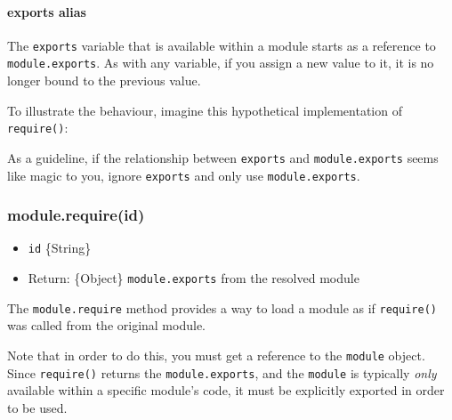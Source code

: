 \paragraph{exports alias}\label{exports-alias}

The \texttt{exports} variable that is available within a module starts
as a reference to \texttt{module.exports}. As with any variable, if you
assign a new value to it, it is no longer bound to the previous value.

To illustrate the behaviour, imagine this hypothetical implementation of
\texttt{require()}:

\begin{Shaded}
\begin{Highlighting}[]
 
   
     
  \NormalTok{);}
   
\NormalTok{\}}
\end{Highlighting}
\end{Shaded}

As a guideline, if the relationship between \texttt{exports} and
\texttt{module.exports} seems like magic to you, ignore \texttt{exports}
and only use \texttt{module.exports}.

\subsubsection{module.require(id)}\label{module.requireid}

\begin{itemize}
\itemsep1pt\parskip0pt
\item
  \texttt{id} \{String\}
\item
  Return: \{Object\} \texttt{module.exports} from the resolved module
\end{itemize}

The \texttt{module.require} method provides a way to load a module as if
\texttt{require()} was called from the original module.

Note that in order to do this, you must get a reference to the
\texttt{module} object. Since \texttt{require()} returns the
\texttt{module.exports}, and the \texttt{module} is typically
\emph{only} available within a specific module's code, it must be
explicitly exported in order to be used.

